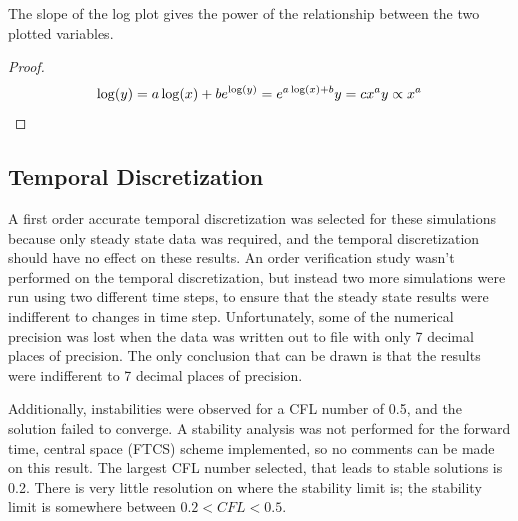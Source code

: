 \begin{proposition}
\label{prop:log_slope}
  The slope of the log plot gives the power of the relationship between the two plotted variables.
\end{proposition}

\begin{proof}
  \begin{displaymath}
    \log(y) = a \log(x) + b \\ \\
    e^{\log(y)} = e^{a \log(x) + b } \\ \\
    y = c x^a \\ \\
    y  \propto  x^a \\     
  \end{displaymath}

\end{proof}

	\subsection{Temporal Discretization}
	\label{sec:t_disc}

A first order accurate temporal discretization was selected for these simulations because only steady state data was required, and the temporal discretization should have no effect on these results.  An order verification study wasn't performed on the temporal discretization, but instead two more simulations were run using two different time steps, to ensure that the steady state results were indifferent to changes in time step.  Unfortunately, some of the numerical precision was lost when the data was written out to file with only 7 decimal places of precision. The only conclusion that can be drawn is that the results were indifferent to 7 decimal places of precision.  

%
%
%
Additionally, instabilities were observed for a CFL number of 0.5, and the solution failed to converge. A stability analysis was not performed for the forward time, central space (FTCS) scheme implemented, so no comments can be made on this result.  The largest CFL number selected, that leads to stable solutions is 0.2.  There is very little resolution on where the stability limit is; the stability limit is somewhere between $0.2 < CFL < 0.5$.

